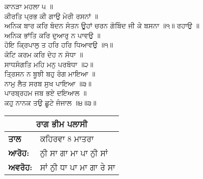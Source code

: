 \documentclass[10pt]{article}
\begin{document}
\begin{flushleft}
{\large{ਕਾਨੜਾ ਮਹਲਾ ੫ ॥ \\[0.2in]

ਕੀਰਤਿ ਪ੍ਰਭ ਕੀ ਗਾਉ ਮੇਰੀ ਰਸਨਾਂ ॥ \\
ਅਨਿਕ ਬਾਰ ਕਰਿ ਬੰਦਨ ਸੰਤਨ ਊਹਾਂ ਚਰਨ ਗੋਬਿੰਦ ਜੀ ਕੇ ਬਸਨਾ ॥੧॥ ਰਹਾਉ ॥ \\ [0.1in]

ਅਨਿਕ ਭਾਂਤਿ ਕਰਿ ਦੁਆਰੁ ਨ ਪਾਵਉ ॥ \\
ਹੋਇ ਕ੍ਰਿਪਾਲੁ ਤ ਹਰਿ ਹਰਿ ਧਿਆਵਉ ॥੧॥ \\ [0.1in]

ਕੋਟਿ ਕਰਮ ਕਰਿ ਦੇਹ ਨ ਸੋਧਾ ॥ \\
ਸਾਧਸੰਗਤਿ ਮਹਿ ਮਨੁ ਪਰਬੋਧਾ ॥੨॥ \\  [0.1in]

ਤ੍ਰਿਸਨ ਨ ਬੂਝੀ ਬਹੁ ਰੰਗ ਮਾਇਆ ॥ \\
ਨਾਮੁ ਲੈਤ ਸਰਬ ਸੁਖ ਪਾਇਆ ॥੩॥ \\  [0.1in]

ਪਾਰਬ੍ਰਹਮ ਜਬ ਭਏ ਦਇਆਲ ॥ \\
ਕਹੁ ਨਾਨਕ ਤਉ ਛੂਟੇ ਜੰਜਾਲ ॥੪॥੩॥ \\ [0.1in]
}}
\end{flushleft}

\begin{table}[!htb]
{\renewcommand{\arraystretch}{1.5}%
\begin{tabular}{|l|p{10cm}|}
\hline
\multicolumn{2}{|c|}{\large{ਰਾਗ ਭੀਮ ਪਲਾਸੀ}} \\ \hline
\bf{ਤਾਲ}     & ਕਹਿਰਵਾ 8 ਮਾਤਰਾ            \\ \hline
\bf{ਆਰੋਹ:}   & ਨੁੀ ਸਾ ਗਾ ਮਾ ਪਾ ਨੁੀ ਸਾਂ   \\ \hline
\bf{ਅਵਰੋਹ:}  & ਸਾਂ ਨੁੀ ਧਾ ਪਾ ਮਾ ਗਾ ਰੇ ਸਾ \\ \hline
\end{tabular} } \quad
\end{table}
\end{document}
